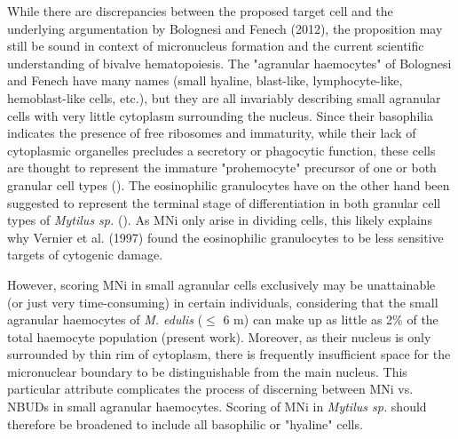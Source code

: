 While there are discrepancies between the proposed target cell and the underlying argumentation by Bolognesi and Fenech (2012), the proposition may still be sound in context of micronucleus formation and the current scientific understanding of bivalve hematopoiesis. The "agranular haemocytes" of Bolognesi and Fenech have many names (small hyaline, blast-like, lymphocyte-like, hemoblast-like cells, etc.), but they are all invariably describing small agranular cells with very little cytoplasm surrounding the nucleus. Since their basophilia indicates the presence of free ribosomes and immaturity, while their lack of cytoplasmic organelles precludes a secretory or phagocytic function, these cells are thought to represent the immature "prohemocyte" precursor of one or both granular cell types (\cite{Hine1999, delaBallina2022, Smith2016}). The eosinophilic granulocytes have on the other hand been suggested to represent the terminal stage of differentiation in both granular cell types of \emph{Mytilus sp.} (\cite{Cheng1984}). As MNi only arise in dividing cells, this likely explains why Vernier et al. (1997) found the eosinophilic granulocytes to be less sensitive targets of cytogenic damage.

However, scoring MNi in small agranular cells exclusively may be unattainable (or just very time-consuming) in certain individuals, considering that the small agranular haemocytes of \emph{M. edulis} ($\leq$ 6 \micro m) can make up as little as 2\% of the total haemocyte population (present work). Moreover, as their nucleus is only surrounded by thin rim of cytoplasm, there is frequently insufficient space for the micronuclear boundary to be distinguishable from the main nucleus. This particular attribute complicates the process of discerning between MNi vs. NBUDs in small agranular haemocytes. Scoring of MNi in \emph{Mytilus sp.} should therefore be broadened to include all basophilic or "hyaline" cells.

